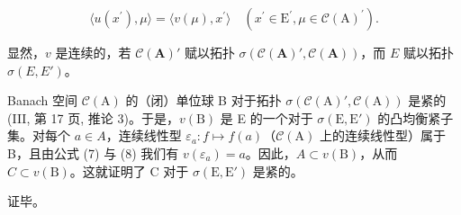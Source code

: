 \[
\langle u (x ^ {\prime}), \mu \rangle = \langle v (\mu), x ^ {\prime} \rangle \quad \left(x ^ {\prime} \in \mathrm{E} ^ {\prime}, \mu \in \mathcal {C} (\mathrm{A}) ^ {\prime}\right).\tag{8}
\]

显然，\(v\) 是连续的，若 \(\mathcal{C}(\mathbf{A})'\) 赋以拓扑 \(\sigma(\mathcal{C}(\mathbf{A})', \mathcal{C}(\mathbf{A}))\)，而 \(E\) 赋以拓扑 \(\sigma(E, E')\)。

Banach 空间 \(\mathcal{C}(\mathrm{A})\) 的（闭）单位球 B 对于拓扑 \(\sigma(\mathcal{C}(\mathrm{A})', \mathcal{C}(\mathrm{A}))\) 是紧的 (III, 第 17 页, 推论 3)。于是，\(v(\mathrm{B})\) 是 E 的一个对于 \(\sigma(\mathrm{E}, \mathrm{E}')\) 的凸均衡紧子集。对每个 \(a \in A\)，连续线性型 \(\varepsilon_a : f \mapsto f(a)\)（\(\mathcal{C}(\mathrm{A})\) 上的连续线性型）属于 B，且由公式 (7) 与 (8) 我们有 \(v(\varepsilon_a) = a\)。因此，\(A \subset v(\mathrm{B})\)，从而 \(C \subset v(\mathrm{B})\)。这就证明了 C 对于 \(\sigma(\mathrm{E}, \mathrm{E}')\) 是紧的。

证毕。

